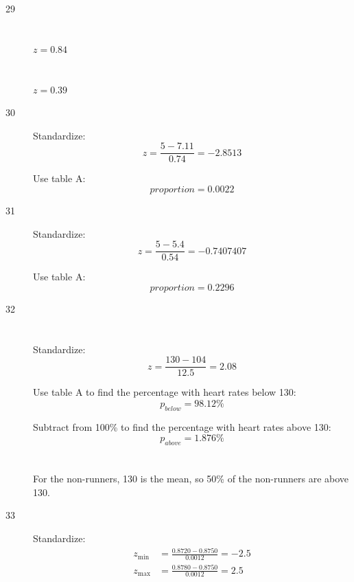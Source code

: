 \documentclass[letterpaper, landscape]{exam}
\begin{document}
\begin{description}
      \item[29]
        \begin{parts}
          \part{} $z = 0.84$
          \part{} $z = 0.39$ 
        \end{parts}

      \item[30]
        Standardize:
        \[
          z = \frac{5 - 7.11}{0.74} = -2.8513
        \]

        Use table A:\@
        \[
          proportion = \boxed{ 0.0022 } 
        \]

      \item[31]
        Standardize:
        \[
          z = \frac{5 - 5.4}{0.54} = -0.7407407
        \]

        Use table A:\@
        \[
          proportion = \boxed{ 0.2296 } 
        \]

      \item[32]
        \begin{parts}
          \part{} 
            Standardize:
            \[
              z = \frac{130 - 104}{12.5} = 2.08
            \]

            Use table A to find the percentage with heart rates below 130: 
            \[
              p_{below} = 98.12 \%
            \]

            Subtract from 100\% to find the percentage with heart rates above
            130:
            \[
              p_{above} = \boxed{ 1.876 \% }
            \]

          \part{}
            For the non-runners, 130 is the mean, so 50\% of the non-runners
            are above 130.

        \end{parts}

      \item[33]
        Standardize:
        \begin{align*}
          z_{\min} & = \frac{0.8720 - 0.8750}{0.0012} = -2.5 \\
          z_{\max} & = \frac{0.8780 - 0.8750}{0.0012} = 2.5 \\
        \end{align*}


\end{description}
\end{document}
